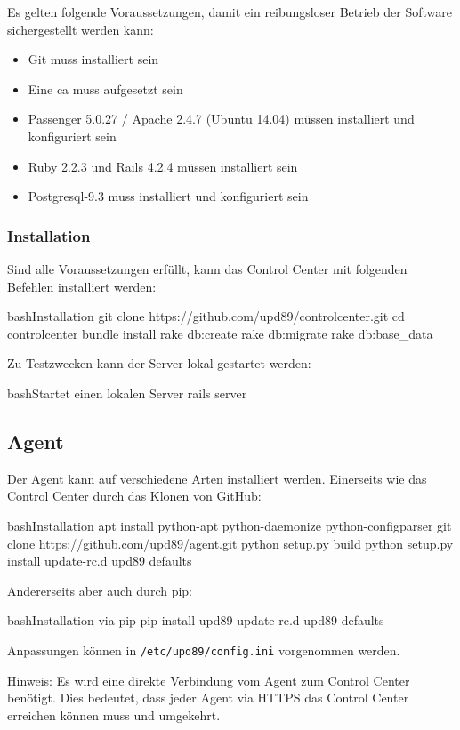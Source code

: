 Es gelten folgende Voraussetzungen, damit ein reibungsloser Betrieb der Software sichergestellt werden kann:

\begin{itemize}
    \item Git muss installiert sein
    \item Eine \gls{ca} muss aufgesetzt sein
    \item Passenger 5.0.27 / Apache 2.4.7 (Ubuntu 14.04) müssen installiert und konfiguriert sein
    \item Ruby 2.2.3 und Rails 4.2.4 müssen installiert sein
    \item Postgresql-9.3 muss installiert und konfiguriert sein
\end{itemize}

\subsubsection*{Installation}

Sind alle Voraussetzungen erfüllt, kann das Control Center mit folgenden Befehlen installiert werden:

\begin{srclst}[label=lst:cc:installation]{bash}{Installation}
git clone https://github.com/upd89/controlcenter.git
cd controlcenter
bundle install
rake db:create
rake db:migrate
rake db:base_data
\end{srclst}

Zu Testzwecken kann der Server lokal gestartet werden:

\begin{srclst}[label=lst:cc:localtest]{bash}{Startet einen lokalen Server}
rails server
\end{srclst}


\subsection*{Agent}

Der Agent kann auf verschiedene Arten installiert werden. Einerseits wie das Control Center durch das Klonen von GitHub:

\begin{srclst}[label=lst:agent:installation]{bash}{Installation}
apt install python-apt python-daemonize python-configparser
git clone https://github.com/upd89/agent.git
python setup.py build
python setup.py install
update-rc.d upd89 defaults
\end{srclst}

Andererseits aber auch durch pip:

\begin{srclst}[label=lst:agent:installation_by_pip]{bash}{Installation via pip}
pip install upd89
update-rc.d upd89 defaults
\end{srclst}

Anpassungen können in \texttt{/etc/upd89/config.ini} vorgenommen werden.

Hinweis: Es wird eine direkte Verbindung vom Agent zum Control Center benötigt. Dies bedeutet, dass jeder Agent via HTTPS das Control Center erreichen können muss und umgekehrt.
